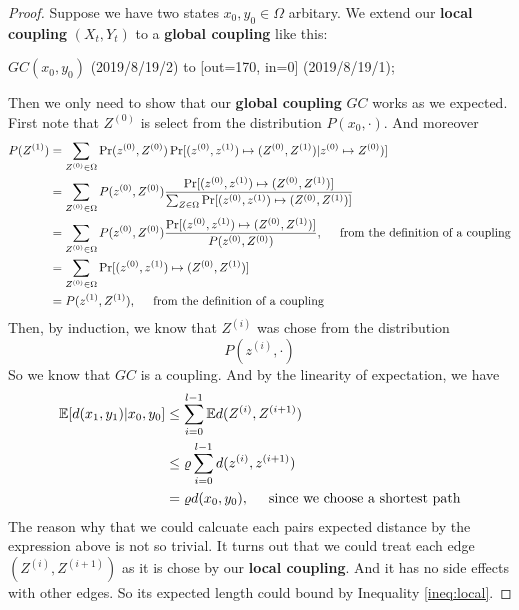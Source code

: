\begin{proof}
  Suppose we have two states $x_0, y_0\in\Omega$ arbitary.
  We extend our \textbf{local coupling} $(X_t, Y_t)$ to a \textbf{global coupling} like this:
  \clearpage
  \begin{algorithm}
    $GC(x_0, y_0)$ 
   \draw [->, very thick, color = blue] (2019/8/19/2) to [out=170, in=0] (2019/8/19/1);
  \end{algorithm}
  Then we only need to show that
  our \textbf{global coupling} $GC$ works as we expected.
  First note that $Z^{(0)}$ is select from the distribution $P(x_0, \cdot)$.
  And moreover
  \begin{align*}
    P(Z^{(1)}) &= \sum_{Z^{(0)}\in\Omega} \Pr(z^{(0)}, Z^{(0)})\Pr[(z^{(0)},z^{(1)})\mapsto (Z^{(0)}, Z^{(1)})|z^{(0)}\mapsto Z^{(0)})] \\
    &= \sum_{Z^{(0)}\in\Omega} P(z^{(0)}, Z^{(0)})\frac{\Pr[(z^{(0)}, z^{(1)})\mapsto (Z^{(0)}, Z^{(1)})]}{\sum_{Z\in\Omega} \Pr[(z^{(0)}, z^{(1)})\mapsto(Z^{(0)}, Z^{(1)})]} \\
    &= \sum_{Z^{(0)}\in\Omega} P(z^{(0)}, Z^{(0)})\frac{\Pr[(z^{(0)}, z^{(1)})\mapsto (Z^{(0)}, Z^{(1)})]}{P(z^{(0)}, Z^{(0)})}, \hspace{0.5cm} \mbox{from the definition of a coupling} \\
    &= \sum_{Z^{(0)}\in\Omega} \Pr[(z^{(0)}, z^{(1)})\mapsto (Z^{(0)}, Z^{(1)})] \\
    &= P(z^{(1)}, Z^{(1)}), \hspace{0.5cm} \mbox{from the definition of a coupling}
  \end{align*}
  Then, by induction, we know that $Z^{(i)}$ was chose from the distribution 
  \[P(z^{(i)}, \cdot)\]
  So we know that $GC$ is a coupling.
  And by the linearity of expectation, we have
  \begin{align*}
    \mathbb{E}[d(x_1, y_1)|x_0, y_0] &\leq \sum_{i=0}^{l-1} \mathbb{E}d(Z^{(i)}, Z^{(i+1)}) \\
    &\leq \varrho\sum_{i=0}^{l-1} d(z^{(i)}, z^{(i+1)}) \\
    &= \varrho d(x_0, y_0), \hspace{0.5cm} \mbox{since we choose a shortest path}
  \end{align*}
  The reason why that we could calcuate each pairs expected distance by the expression above is not so trivial.
  It turns out that we could treat each edge $(Z^{(i)}, Z^{(i+1)})$ as it is chose by our \textbf{local coupling}. And it has no side effects with other edges. So its expected length could bound by Inequality \ref{ineq:local}.
\end{proof}

